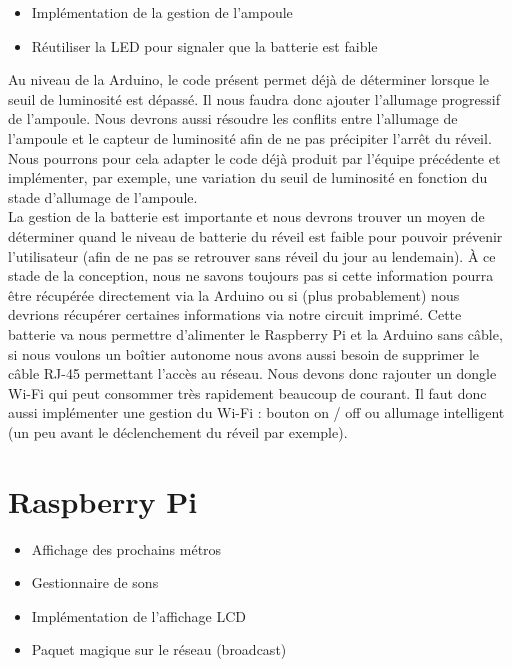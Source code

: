 \documentclass[a4paper, 12pt, french]{article}
\begin{document}
\begin{itemize}
	\item Implémentation de la gestion de l'ampoule
	\item Réutiliser la LED pour signaler que la batterie est faible 
\end{itemize}
\vspace{20px}

Au niveau de la Arduino, le code présent permet déjà de déterminer lorsque le seuil de luminosité est dépassé. Il nous faudra donc ajouter l'allumage progressif de l'ampoule. Nous devrons aussi résoudre les conflits entre l'allumage de l'ampoule et le capteur de luminosité afin de ne pas précipiter l'arrêt du réveil. Nous pourrons pour cela adapter le code déjà produit par l'équipe précédente et implémenter, par exemple, une variation du seuil de luminosité en fonction du stade d'allumage de l'ampoule. \\

La gestion de la batterie est importante et nous devrons trouver un moyen de déterminer quand le niveau de batterie du réveil est faible pour pouvoir prévenir l'utilisateur (afin de ne pas se retrouver sans réveil du jour au lendemain). À ce stade de la conception, nous ne savons toujours pas si cette information pourra être récupérée directement via la Arduino ou si (plus probablement) nous devrions récupérer certaines informations via notre circuit imprimé. Cette batterie va nous permettre d'alimenter le Raspberry Pi et la Arduino sans câble, si nous voulons un boîtier autonome nous avons aussi besoin de supprimer le câble RJ-45 permettant l'accès au réseau. Nous devons donc rajouter un dongle Wi-Fi qui peut consommer très rapidement beaucoup de courant. Il faut donc aussi implémenter une gestion du Wi-Fi : bouton on / off ou allumage intelligent (un peu avant le déclenchement du réveil par exemple). \\


\section{Raspberry Pi} %
\label{sec:raspberry_pi}

\begin{itemize}
	\item Affichage des prochains métros
	\item Gestionnaire de sons
	\item Implémentation de l'affichage LCD
	\item Paquet magique sur le réseau (broadcast) 
\end{itemize}
\vspace{20px}
\end{document}
